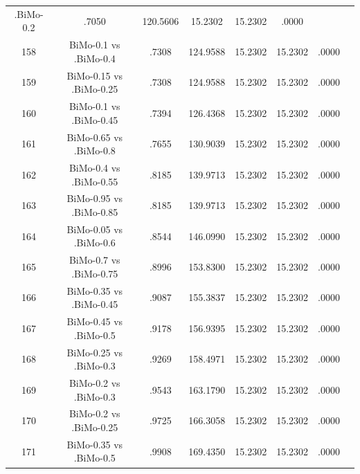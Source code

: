 \documentclass[a4paper,10pt]{article}
\begin{document}
\begin{landscape}
\begin{table}[!htp]
\begin{tabular}{cccccccc}
.BiMo-0.2&.7050&120.5606&15.2302&15.2302&.0000\\158&BiMo-0.1 vs .BiMo-0.4&.7308&124.9588&15.2302&15.2302&.0000\\159&BiMo-0.15 vs .BiMo-0.25&.7308&124.9588&15.2302&15.2302&.0000\\160&BiMo-0.1 vs .BiMo-0.45&.7394&126.4368&15.2302&15.2302&.0000\\161&BiMo-0.65 vs .BiMo-0.8&.7655&130.9039&15.2302&15.2302&.0000\\162&BiMo-0.4 vs .BiMo-0.55&.8185&139.9713&15.2302&15.2302&.0000\\163&BiMo-0.95 vs .BiMo-0.85&.8185&139.9713&15.2302&15.2302&.0000\\164&BiMo-0.05 vs .BiMo-0.6&.8544&146.0990&15.2302&15.2302&.0000\\165&BiMo-0.7 vs .BiMo-0.75&.8996&153.8300&15.2302&15.2302&.0000\\166&BiMo-0.35 vs .BiMo-0.45&.9087&155.3837&15.2302&15.2302&.0000\\167&BiMo-0.45 vs .BiMo-0.5&.9178&156.9395&15.2302&15.2302&.0000\\168&BiMo-0.25 vs .BiMo-0.3&.9269&158.4971&15.2302&15.2302&.0000\\169&BiMo-0.2 vs .BiMo-0.3&.9543&163.1790&15.2302&15.2302&.0000\\170&BiMo-0.2 vs .BiMo-0.25&.9725&166.3058&15.2302&15.2302&.0000\\171&BiMo-0.35 vs .BiMo-0.5&.9908&169.4350&15.2302&15.2302&.0000\\\hline
\end{tabular}
\end{table}

\end{landscape}
\end{document}
